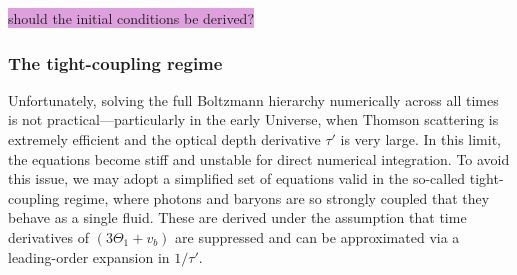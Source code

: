 \documentclass{aa}
\numberwithin{equation}{section}
\numberwithin{table}{section}
\numberwithin{figure}{section}
\begin{document}
\colorbox{Plum}{should the initial conditions be derived?}






\subsubsection{The tight-coupling regime}\label{subsubsec: III theory tight-coupling}
Unfortunately, solving the full Boltzmann hierarchy numerically across all times is not practical—particularly in the early Universe, when Thomson scattering is extremely efficient and the optical depth derivative $\tau'$ is very large. In this limit, the equations become stiff and unstable for direct numerical integration. To avoid this issue, we may adopt a simplified set of equations valid in the so-called tight-coupling regime, where photons and baryons are so strongly coupled that they behave as a single fluid. These are derived under the assumption that time derivatives of $(3\Theta_1 + v_b)$ are suppressed and can be approximated via a leading-order expansion in $1/\tau'$.
\end{document}
